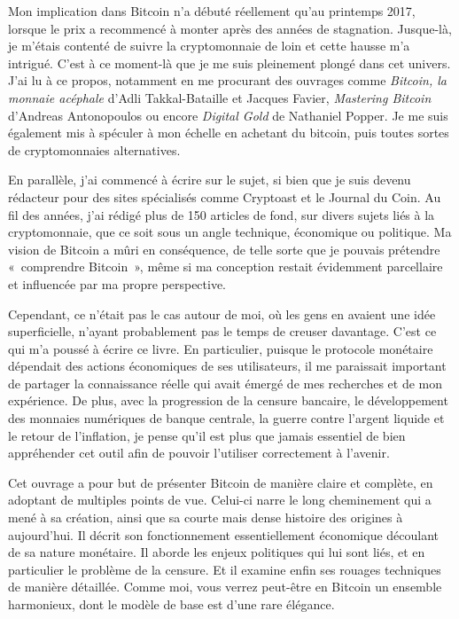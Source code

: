 Mon implication dans Bitcoin n'a débuté réellement qu'au printemps 2017, lorsque le prix a recommencé à monter après des années de stagnation. Jusque-là, je m'étais contenté de suivre la cryptomonnaie de loin et cette hausse m'a intrigué. C'est à ce moment-là que je me suis pleinement plongé dans cet univers. J'ai lu à ce propos, notamment en me procurant des ouvrages comme \emph{Bitcoin, la monnaie acéphale} d'Adli Takkal-Bataille et Jacques Favier, \emph{Mastering Bitcoin} d'Andreas Antonopoulos ou encore \emph{Digital Gold} de Nathaniel Popper. Je me suis également mis à spéculer à mon échelle en achetant du bitcoin, puis toutes sortes de cryptomonnaies alternatives.

En parallèle, j'ai commencé à écrire sur le sujet, si bien que je suis devenu rédacteur pour des sites spécialisés comme Cryptoast et le Journal du Coin. Au fil des années, j'ai rédigé plus de 150 articles de fond, sur divers sujets liés à la cryptomonnaie, que ce soit sous un angle technique, économique ou politique. Ma vision de Bitcoin a mûri en conséquence, de telle sorte que je pouvais prétendre «~comprendre Bitcoin~», même si ma conception restait évidemment parcellaire et influencée par ma propre perspective.

Cependant, ce n'était pas le cas autour de moi, où les gens en avaient une idée superficielle, n'ayant probablement pas le temps de creuser davantage. C'est ce qui m'a poussé à écrire ce livre. En particulier, puisque le protocole monétaire dépendait des actions économiques de ses utilisateurs, il me paraissait important de partager la connaissance réelle qui avait émergé de mes recherches et de mon expérience. De plus, avec la progression de la censure bancaire, le développement des monnaies numériques de banque centrale, la guerre contre l'argent liquide et le retour de l'inflation, je pense qu'il est plus que jamais essentiel de bien appréhender cet outil afin de pouvoir l'utiliser correctement à l'avenir.

Cet ouvrage a pour but de présenter Bitcoin de manière claire et complète, en adoptant de multiples points de vue. Celui-ci narre le long cheminement qui a mené à sa création, ainsi que sa courte mais dense histoire des origines à aujourd'hui. Il décrit son fonctionnement essentiellement économique découlant de sa nature monétaire. Il aborde les enjeux politiques qui lui sont liés, et en particulier le problème de la censure. Et il examine enfin ses rouages techniques de manière détaillée. Comme moi, vous verrez peut-être en Bitcoin un ensemble harmonieux, dont le modèle de base est d'une rare élégance.

